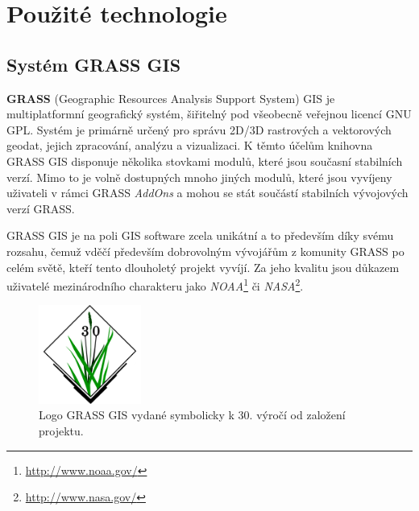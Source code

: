 \documentclass[a4paper,12pt,oneside]{report}
\begin{document}
\setcounter{footnote}{1}



\newpage
\setcounter{footnote}{1}
\section{Použité technologie}

\subsection{Systém GRASS GIS}
\textbf{GRASS} (Geographic Resources Analysis Support System) GIS  je multiplatformní geografický systém, šiřitelný pod všeobecně veřejnou licencí \acs{GNU GPL}. Systém je primárně určený pro správu 2D/3D rastrových a vektorových geodat, jejich zpracování, analýzu a vizualizaci. K těmto účelům knihovna GRASS GIS disponuje několika stovkami modulů, které jsou současní stabilních verzí. Mimo to je volně dostupných mnoho jiných modulů, které jsou vyvíjeny uživateli v rámci GRASS \textit{AddOns} a mohou se stát součástí stabilních vývojových verzí GRASS. 

GRASS GIS je na poli GIS software zcela unikátní a to především díky svému rozsahu, čemuž vděčí především dobrovolným vývojářům z komunity GRASS po celém světě, kteří tento dlouholetý projekt vyvíjí. Za jeho kvalitu jsou důkazem uživatelé mezinárodního charakteru jako \textit{NOAA}\footnote{\url{http://www.noaa.gov/}} či \textit{NASA}\footnote{\url{http://www.nasa.gov/}}. 

\begin{figure}[h!]
    \centering
    \includegraphics[width=0.3\textwidth]{./img/grass/grasslogo.png}
    \caption[Logo GRASS]{\centering Logo GRASS GIS vydané symbolicky k 30. výročí od založení projektu. \footnotemark }
 \end{figure}   
\end{document}
